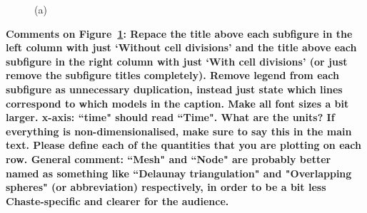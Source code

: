 \documentclass{article}
\newcommand{\highlight}[1]{{\color{red} \bf{#1}}}
\begin{document}
\begin{figure}
{\label{fig:CellSorting:e}
}
\caption{(a)}
\label{fig:CellSorting}
\end{figure}

\highlight{Comments on Figure~\ref{fig:CellSorting}: 
Repace the title above each subfigure in the left column with just `Without cell divisions' and the title above each subfigure in the right column with just `With cell divisions' (or just remove the subfigure titles completely).
Remove legend from each subfigure as unnecessary duplication, instead just state which lines correspond to which models in the caption. 
Make all font sizes a bit larger. 
x-axis: ``time" should read ``Time". 
What are the units? If everything is non-dimensionalised, make sure to say this in the main text. 
Please define each of the quantities that you are plotting on each row. 
General comment: ``Mesh" and ``Node" are probably better named as something like ``Delaunay triangulation" and "Overlapping spheres" (or abbreviation) respectively, in order to be a bit less Chaste-specific and clearer for the audience.}
\end{document}
